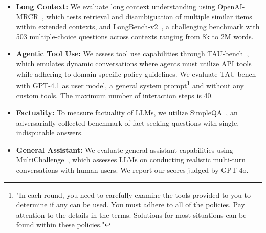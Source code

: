 \begin{itemize}
    \item \textbf{Long Context:} We evaluate long context understanding using OpenAI-MRCR~\citep{openai_mrcr}, which tests retrieval and disambiguation of multiple similar items within extended contexts, and LongBench-v2~\citep{bai2024longbench2}, a challenging benchmark with 503 multiple-choice questions across contexts ranging from 8k to 2M words.
    
    \item \textbf{Agentic Tool Use:} We assess tool use capabilities through TAU-bench~\citep{yaotau}, which emulates dynamic conversations where agents must utilize API tools while adhering to domain-specific policy guidelines. We evaluate TAU-bench with GPT-4.1 as user model, a general system prompt\footnote{"In each round, you need to carefully examine the tools provided to you to determine if any can be used. You must adhere to all of the policies. Pay attention to the details in the terms. Solutions for most situations can be found within these policies."} and without any custom tools. 
    The maximum number of interaction steps is 40. 

    \item \textbf{Factuality:} To measure factuality of LLMs, we utilize SimpleQA~\citep{wei2024measuring}, an adversarially-collected benchmark of fact-seeking questions with single, indisputable answers.

    \item \textbf{General Assistant:} We evaluate general assistant capabilities using MultiChallenge~\citep{sirdeshmukh2025multichallenge}, which assesses LLMs on conducting realistic multi-turn conversations with human users. We report our scores judged by GPT-4o. 
\end{itemize}


